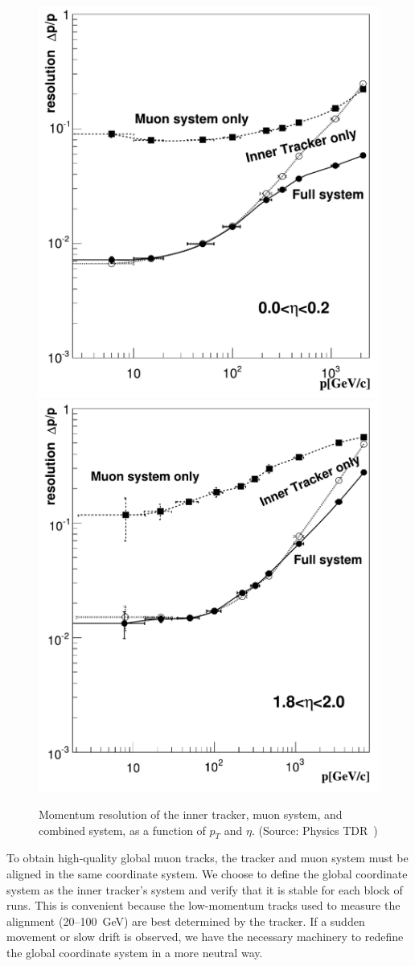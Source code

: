 \documentclass[12pt]{article}
\begin{document}
\begin{figure}[hb]
\begin{center} \includegraphics[width=0.35\linewidth]{Figure_001-005-a.pdf} \hspace{0.5 cm} \includegraphics[width=0.35\linewidth]{Figure_001-005-b.pdf} \end{center}
\caption{Momentum resolution of the inner tracker, muon system, and combined system, as a function of $p_T$ and $\eta$.  (Source: Physics TDR~\cite{tdr}) \label{fig:tdr_muon_resolution}}
\end{figure}

To obtain high-quality global muon tracks, the tracker and muon system
must be aligned in the same coordinate system.  We choose to define
the global coordinate system as the inner tracker's system and verify
that it is stable for each block of runs.  This is convenient because
the low-momentum tracks used to measure the alignment (20--100~GeV)
are best determined by the tracker.  If a sudden movement or slow
drift is observed, we have the necessary machinery to redefine the
global coordinate system in a more neutral way.
\end{document}
